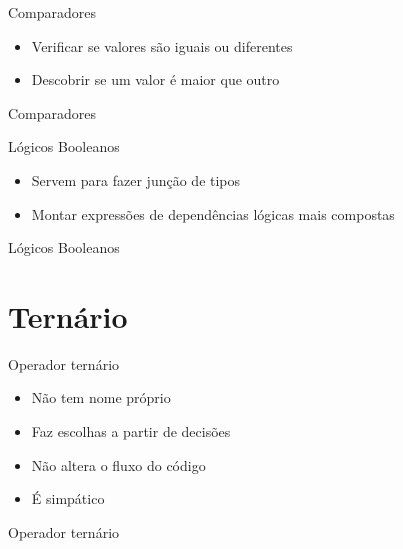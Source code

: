 \documentclass[11pt]{beamer}
\begin{document}
	\begin{frame}{Comparadores}
		\begin{itemize}
			\presentationPause\item Verificar se valores são iguais ou diferentes
			\presentationPause\item Descobrir se um valor é maior que outro
		\end{itemize}
		\presentationPause
	\end{frame}\begin{frame}{Comparadores}
		
	\end{frame}

	\begin{frame}{Lógicos Booleanos}
		\begin{itemize}
			\presentationPause\item Servem para fazer junção de tipos 
			\presentationPause\item Montar expressões de dependências lógicas mais compostas
		\end{itemize}
		\presentationPause
	\end{frame}\begin{frame}{Lógicos Booleanos}
		
	\end{frame}

\section{Ternário}
	\begin{frame}{Operador ternário}
		\begin{itemize}
			\presentationPause\item Não tem nome próprio \presentationPause\frownie
			\presentationPause\item Faz escolhas a partir de decisões
			\presentationPause\item Não altera o fluxo do código
			\presentationPause\item É simpático
		\end{itemize}
		\presentationPause
	\end{frame}\begin{frame}{Operador ternário}
		
	\end{frame}
\end{document}
